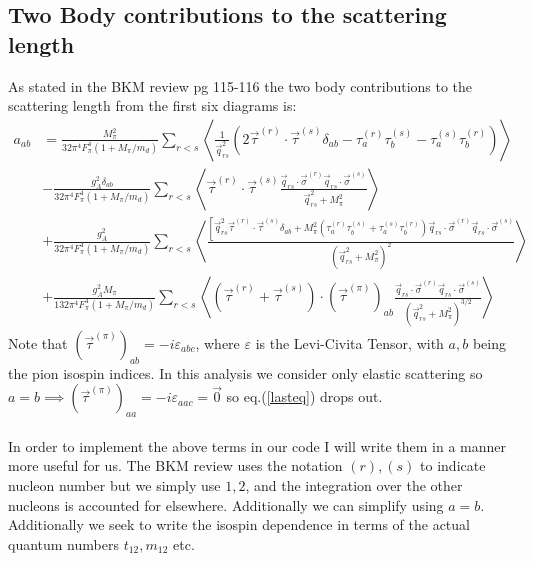 \documentclass[11pt]{article}
\begin{document}
\subsection{Two Body contributions to the scattering length}
As stated in the BKM review pg 115-116 the two body contributions to the scattering length from the first six diagrams is:
\begin{align}
    a_{ab}&= \frac{M_\pi^2}{32 \pi^4 F_\pi^4\left(1+M_\pi / m_d\right)} \sum_{r<s}\left\langle\frac{1}{\vec{q}_{r s}^2}\left(2 \vec{\tau}^{(r)} \cdot \vec{\tau}^{(s)} \delta_{a b}-\tau_a^{(r)} \tau_b^{(s)}-\tau_a^{(s)} \tau_b^{(r)}\right)\right\rangle\\
          & -\frac{g_A^2 \delta_{a b}}{32 \pi^4 F_\pi^4\left(1+M_\pi / m_d\right)} \sum_{r<s}\left\langle\vec{\tau}^{(r)} \cdot \vec{\tau}^{(s)} \frac{\vec{q}_{r s} \cdot \vec{\sigma}^{(r)} \vec{q}_{r s} \cdot \vec{\sigma}^{(s)}}{\vec{q}_{r s}^2+M_\pi^2}\right\rangle \\
          &+\frac{g_A^2}{32 \pi^4 F_\pi^4\left(1+M_\pi / m_d\right)} \sum_{r<s}\left\langle\frac{\left[\vec{q}_{r s}^2 \vec{\tau}^{(r)} \cdot \vec{\tau}^{(s)} \delta_{a b}+M_\pi^2\left(\tau_a^{(r)} \tau_b^{(s)}+\tau_a^{(s)} \tau_b^{(r)}\right) \vec{q}_{r s} \cdot \vec{\sigma}^{(r)} \vec{q}_{r s} \cdot \vec{\sigma}^{(s)}\right.}{\left(\vec{q}_{r s}^2+M_\pi^2\right)^2}\right\rangle \\
          &+\frac{g_A^2 M_\pi}{132 \pi^4 F_\pi^4\left(1+M_\pi / m_d\right)} \sum_{r<s}\left\langle\left(\vec{\tau}^{(r)}+\vec{\tau}^{(s)}\right) \cdot\left(\vec{\tau}^{(\pi)}\right)_{a b} \frac{\vec{q}_{r s} \cdot \vec{\sigma}^{(r)} \vec{q}_{r s} \cdot \vec{\sigma}^{(s)}}{\left(\vec{q}_{r s}^2+M_\pi^2\right)^{3 / 2}}\right\rangle\label{lasteq}
\end{align}
Note that $\left(\vec{\tau}^{(\pi)}\right)_{ab}=-i\varepsilon_{abc}$, where $\varepsilon$ is the Levi-Civita Tensor, with $a,b$ being the pion isospin indices.
In this analysis we consider only elastic scattering so $a=b \implies\left(\vec{\tau}^{(\pi)}\right)_{aa}=-i\varepsilon_{aac}=\vec{0}$ so eq.(\ref{lasteq}) drops out.\\~\\
In order to implement the above terms in our code I will write them in a manner more useful for us.
The BKM review uses the notation $(r), (s)$ to indicate nucleon number but we simply use $1,2$, and the integration over the other nucleons is accounted for elsewhere.
Additionally we can simplify using $a=b$.
Additionally we seek to write the isospin dependence in terms of the actual quantum numbers $t_{12}, m_{12}$ etc.
\end{document}
